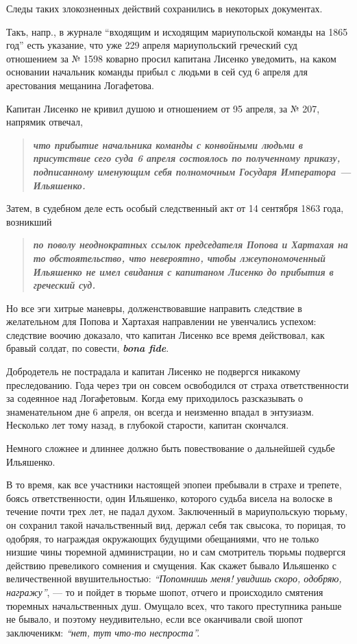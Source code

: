 \documentclass[a4paper,20pt]{article}
\begin{document}
Следы таких злокозненных действий сохранились в
некоторых документах.

Такъ, напр., в журнале ``входящим и исходящим
мариупольской команды на 1865 год'' есть указание, что
уже 229 апреля мариупольский греческий суд отношением 
за № 1598 коварно просил капитана Лисенко уведомить,
на каком основании начальник команды прибыл с людьми в сей суд 6 апреля для 
арестования мещанина Логафетова.

Капитан Лисенко не кривил душою и отношением от 95 апреля, за № 207, напрямик
отвечал, 

\begin{quote}
\em\bfseries
что прибытие начальника команды с конвойными людьми в
присутствие сего суда 6 апреля состоялось по полученному
приказу, подписанному именующим себя полномочным
Государя Императора — Ильяшенко.
\end{quote}

Затем, в судебном деле есть особый следственный
акт от 14 сентября 1863 года, возникший 
\begin{quote}
\em\bfseries
по поволу неоднократных ссылок председателя Попова и Хартахая
на то обстоятельство, что невероятно, чтобы лжеупономоченный 
Ильяшенко не имел свидания с капитаном Лисенко до прибытия в греческий суд.
\end{quote}

Но все эги хитрые маневры, долженствовавшие направить следствие в желательном для Попова и Хартахая
направлении не увенчались успехом: следствие воочию доказало, что капитан Лисенко все время действовал, как бравый
солдат, по совести, \textbf{\em bona fide}.

Добродетель не пострадала и капитан Лисенко не подвергся никакому
преследованию. Года через три он совсем освободился от страха ответственности
за содеянное над Логафетовым.  Когда ему приходилось разсказывать о
знаменательном дне 6 апреля, он всегда и неизменно впадал в энтузиазм.
Несколько лет тому назад, в глубокой старости, капитан скончался. 

Немного сложнее и длиннее должно быть повествование о дальнейшей судьбе Ильяшенко.

В то время, как все участники настоящей эпопеи
пребывали в страхе и трепете, боясь ответственности, один
Ильяшенко, которого судьба висела на волоске в течение
почти трех лет, не падал духом. Заключенный в мариупольскую тюрьму, он сохранил такой начальственный вид,
держал себя так свысока, то порицая, то одобряя,
то награждая окружающих будущими обещаниями, 
что не только низшие чины тюремной администрации, но и сам смотритель тюрьмы подвергся действию
превеликого сомнения и смущения. Как скажет бывало Ильяшенко 
с величественной ввушительностью: \emph{``Попомнишь меня! увидишь скоро,
одобряю, награжу''}, — то и пойдет в тюрьме шопот,
отчего и происходило смятения тюремных начальственных душ.
Омущало всех, что такого преступника раньше не
бывало, и поэтому неудивительно, если все оканчивали свой
шопот заключеникм: \emph{``нет, тут что-то неспроста''.}
\end{document}
